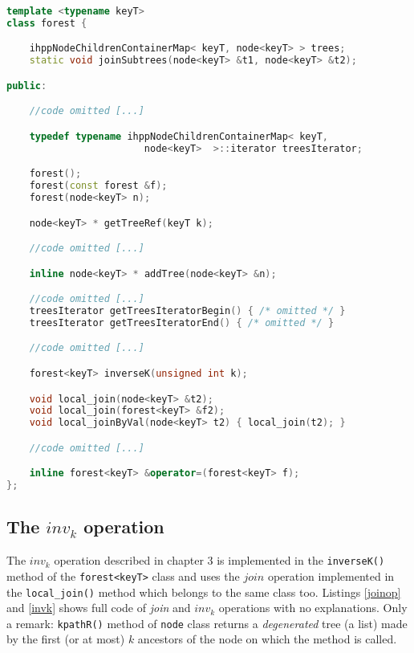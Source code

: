 \documentclass[a4paper,10pt]{report}
\begin{document}
\begin{lstlisting}[language=C++,
	caption={partial definition of \texttt{forest<keyT>} class},
	label=forestClass, frame=leftline]
template <typename keyT>
class forest {

	ihppNodeChildrenContainerMap< keyT, node<keyT> > trees;
	static void joinSubtrees(node<keyT> &t1, node<keyT> &t2);

public:

	//code omitted [...]

	typedef typename ihppNodeChildrenContainerMap< keyT,
						node<keyT>  >::iterator treesIterator;

	forest();
	forest(const forest &f);
	forest(node<keyT> n);

	node<keyT> * getTreeRef(keyT k);

	//code omitted [...]

	inline node<keyT> * addTree(node<keyT> &n);

	//code omitted [...]
	treesIterator getTreesIteratorBegin() { /* omitted */ }
	treesIterator getTreesIteratorEnd() { /* omitted */ }

	//code omitted [...]

	forest<keyT> inverseK(unsigned int k);

	void local_join(node<keyT> &t2);
	void local_join(forest<keyT> &f2);
	void local_joinByVal(node<keyT> t2) { local_join(t2); }

	//code omitted [...]

	inline forest<keyT> &operator=(forest<keyT> f);
};

\end{lstlisting}

\subsection{The $inv_k$ operation}

The $inv_k$ operation described in chapter 3 is implemented
in the \verb|inverseK()| method of the \verb|forest<keyT>| class
and uses the $join$ operation implemented in
the \verb|local_join()| method which belongs to the same class too.
Listings \ref{joinop} and \ref{invk}
shows full code of \emph{join} and $inv_k$ operations with no
explanations. Only a remark: \verb|kpathR()| method of \verb|node| class
returns a \emph{degenerated} tree (a list) made by the first (or at most) $k$
ancestors of the node on which the method is called.
\end{document}
